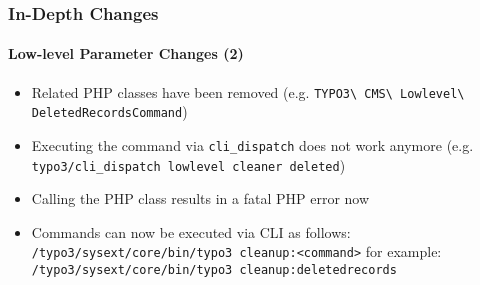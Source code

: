 \begin{frame}[fragile]
	\frametitle{In-Depth Changes}
	\framesubtitle{Low-level Parameter Changes (2)}


	\begin{itemize}
		\item Related PHP classes have been removed\newline
			\smaller(e.g. \texttt{TYPO3\textbackslash
				CMS\textbackslash
				Lowlevel\textbackslash
				DeletedRecordsCommand})
			\normalsize

		\item Executing the command via \texttt{cli\_dispatch} does not work anymore\newline
			\smaller(e.g. \texttt{typo3/cli\_dispatch lowlevel cleaner deleted})\normalsize
		\item Calling the PHP class results in a fatal PHP error now

		\item Commands can now be executed via CLI as follows:\newline
			\smaller\texttt{/typo3/sysext/core/bin/typo3 cleanup:<command>}\normalsize\newline
			for example:\newline
			\smaller\texttt{/typo3/sysext/core/bin/typo3 cleanup:deletedrecords}\normalsize

	\end{itemize}

\end{frame}

